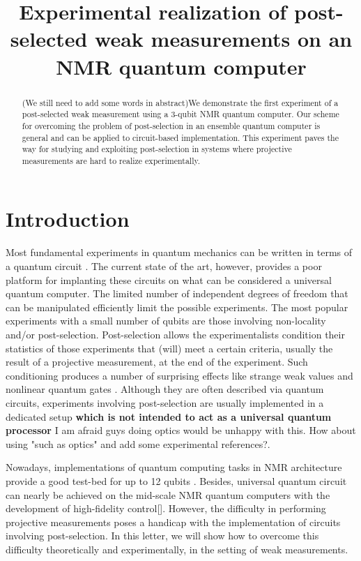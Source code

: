 \documentclass[aps,pra,12pt,onecolumn,showpacs,superscriptaddress,floatfix,footinbib,subfigure]{revtex4}
\begin{document}
\title{Experimental realization of post-selected weak measurements on an NMR quantum computer}



\begin{abstract}
 {\color{red}(We still need to add some words in abstract)}We demonstrate the first experiment of a post-selected weak measurement using a 3-qubit NMR quantum computer. Our scheme for overcoming the problem of post-selection in an ensemble quantum computer is general and can be applied to circuit-based implementation. This experiment  paves the way for studying and exploiting post-selection in systems where projective measurements are hard to realize experimentally.

\end{abstract}
\maketitle
\section{Introduction}
Most  fundamental experiments in quantum mechanics can be written in terms of a quantum circuit  \cite{Deutsch1985}. The current state of the art, however,  provides a poor platform for implanting these circuits on what can be considered a universal quantum computer. The limited number of  independent degrees of freedom  that can be manipulated efficiently limit the possible experiments. The most popular experiments with a small number of qubits are those involving non-locality and/or post-selection. Post-selection allows the {\color{red}experimentalists} condition their statistics of those experiments that (will) meet a certain criteria, usually the result of a projective measurement, at the end of the experiment. Such conditioning produces a number of surprising effects  like  strange weak values \cite{Aharonov1988} and nonlinear quantum gates \cite{Lloyd2011}. Although they are often described via quantum circuits, experiments  involving post-selection are usually implemented in a dedicated setup \textbf{which is not intended to act as a universal quantum processor} {\color{red}I am afraid guys doing optics would be unhappy with this. How about using "such as optics" and add some experimental references?}.


 {\color{red}Nowadays, implementations of quantum computing tasks in NMR architecture provide a good test-bed for up to 12 qubits  \cite{Negrevergne2006}. Besides, universal quantum circuit can nearly be achieved on the mid-scale NMR quantum computers with the development of high-fidelity control[]}. However, the difficulty in performing  projective measurements poses a  {\color{red}handicap} with the implementation of  circuits involving  post-selection. In this letter,  we will show how to overcome this  difficulty theoretically and experimentally, in the setting of weak measurements.
\end{document}

